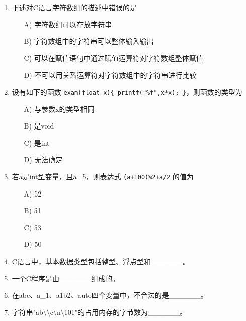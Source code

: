 \documentclass[a4paper,12pt]{article}
\begin{document}
\begin{enumerate}
	\item 下述对C语言字符数组的描述中错误的是
	      \begin{enumerate}
		      \item[A)] 字符数组可以存放字符串
		      \item[B)] 字符数组中的字符串可以整体输入输出
		      \item[C)] 可以在赋值语句中通过赋值运算符对字符数组整体赋值
		      \item[D)] 不可以用关系运算符对字符数组中的字符串进行比较
	      \end{enumerate}
	      \vspace{0.3cm}

	\item 设有如下的函数 \texttt{exam(float x)\{ printf("\%f",x*x); \}}，则函数的类型为
	      \begin{enumerate}
		      \item[A)] 与参数x的类型相同
		      \item[B)] 是void
		      \item[C)] 是int
		      \item[D)] 无法确定
	      \end{enumerate}
	      \vspace{0.3cm}

	\item 若a是int型变量，且a=5，则表达式 \texttt{(a+100)\%2+a/2} 的值为
	      \begin{enumerate}
		      \item[A)] 52
		      \item[B)] 51
		      \item[C)] 53
		      \item[D)] 50
	      \end{enumerate}
	      \vspace{0.3cm}

	\item C语言中，基本数据类型包括整型、浮点型和\_\_\_\_\_\_。
	      \vspace{0.3cm}

	\item 一个C程序是由\_\_\_\_\_\_组成的。
	      \vspace{0.3cm}

	\item 在abc、a\_1、a1b2、auto四个变量中，不合法的是\_\_\_\_\_\_。
	      \vspace{0.3cm}

	\item 字符串"ab$\setminus\setminus$c$\setminus$n$\setminus$101"的占用内存的字节数为\_\_\_\_\_\_。
	      \vspace{0.3cm}


\end{enumerate}
\end{document}
